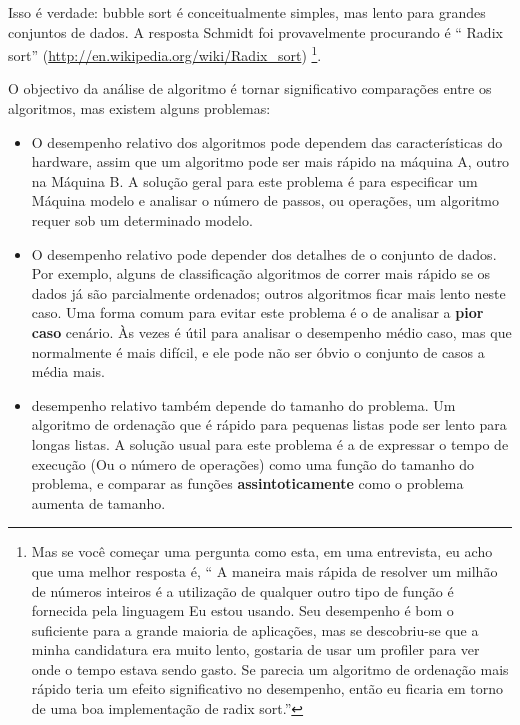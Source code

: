 \documentclass[10pt]{book}
\begin{document}
\begin{v erbatim}
Isso é verdade: bubble sort é conceitualmente simples, mas lento para
grandes conjuntos de dados. A resposta Schmidt foi provavelmente procurando é
`` Radix sort'' (\url{http://en.wikipedia.org/wiki/Radix_sort}) \footnote {
Mas se você começar uma pergunta como esta, em uma entrevista, eu acho que
uma melhor resposta é, `` A maneira mais rápida de resolver um milhão de números inteiros
é a utilização de qualquer outro tipo de função é fornecida pela linguagem
Eu estou usando. Seu desempenho é bom o suficiente para a grande maioria
de aplicações, mas se descobriu-se que a minha candidatura era muito
lento, gostaria de usar um profiler para ver onde o tempo estava sendo
gasto. Se parecia um algoritmo de ordenação mais rápido teria
um efeito significativo no desempenho, então eu ficaria
em torno de uma boa implementação de radix sort.''}.

O objectivo da análise de algoritmo é tornar significativo
comparações entre os algoritmos, mas existem alguns problemas:

\begin{itemize}

\item O desempenho relativo dos algoritmos pode
dependem das características do hardware, assim que um algoritmo
pode ser mais rápido na máquina A, outro na Máquina B.
A solução geral para este problema é para especificar um
{Máquina modelo \bf} e analisar o número de passos, ou
operações, um algoritmo requer sob um determinado modelo.

\item O desempenho relativo pode depender dos detalhes de
o conjunto de dados. Por exemplo, alguns de classificação
algoritmos de correr mais rápido se os dados já são parcialmente ordenados;
outros algoritmos ficar mais lento neste caso.
Uma forma comum para evitar este problema é o de analisar a
{\bf pior caso} cenário. Às vezes é útil para
analisar o desempenho médio caso, mas que normalmente é mais difícil,
e ele pode não ser óbvio o conjunto de casos a média mais.

\item desempenho relativo também depende do tamanho do
problema. Um algoritmo de ordenação que é rápido para pequenas listas
pode ser lento para longas listas.
A solução usual para este problema é a de expressar o tempo de execução
(Ou o número de operações) como uma função do tamanho do problema,
e comparar as funções {\bf assintoticamente} como o problema
aumenta de tamanho.


\end{itemize}
\end{v erbatim}
\end{document}
